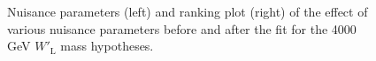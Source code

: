 \begin{figure}[H]
  \centering
  \caption{Nuisance parameters (left) and ranking plot (right) of the effect of various nuisance parameters before and after the fit for the 4000 GeV $W'_{\text{L}}$ mass hypotheses.}
  \label{fig:NuisParAndRanking_WpLH4000}
\end{figure}
